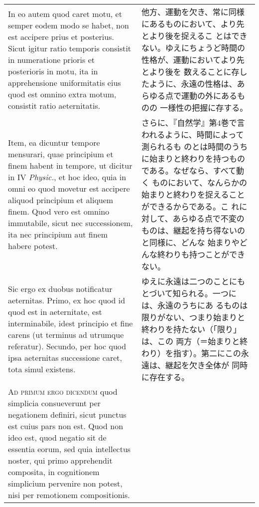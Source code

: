 \documentclass[10pt]{jsarticle} %
\begin{document}
\begin{longtable}{p{21em}p{21em}}
\\

In eo autem quod caret motu, et semper eodem modo se habet, non est
accipere prius et posterius. Sicut igitur ratio temporis consistit in
numeratione prioris et posterioris in motu, ita in apprehensione
uniformitatis eius quod est omnino extra motum, consistit ratio
aeternitatis.

&

他方、運動を欠き、常に同様にあるものにおいて、より先とより後を捉えるこ
とはできない。ゆえにちょうど時間の性格が、運動においてより先とより後を
数えることに存したように、永遠の性格は、あらゆる点で運動の外にあるものの
一様性の把握に存する。

\\

Item, ea dicuntur tempore mensurari, quae principium et finem
habent in tempore, ut dicitur in IV {\it Physic.}, et hoc ideo, quia in
omni eo quod movetur est accipere aliquod principium et aliquem
finem. Quod vero est omnino immutabile, sicut nec successionem, ita nec
principium aut finem habere potest.

&

さらに、『自然学』第4巻で言われるように、時間によって測られるも
のとは時間のうちに始まりと終わりを持つものである。なぜなら、すべて動く
ものにおいて、なんらかの始まりと終わりを捉えることができるからである。こ
れに対して、あらゆる点で不変のものは、継起を持ち得ないのと同様に、どんな
始まりやどんな終わりも持つことができない。


\\

Sic ergo ex duobus notificatur aeternitas. Primo, ex hoc quod
id quod est in aeternitate, est interminabile, idest principio et fine
carens (ut terminus ad utrumque referatur). Secundo, per hoc quod ipsa
aeternitas successione caret, tota simul existens.

&

ゆえに永遠は二つのことにもとづいて知られる。一つには、永遠のうちにあ
るものは限りがない、つまり始まりと終わりを持たない（「限り」は、この
両方（＝始まりと終わり）を指す）。第二にこの永遠は、継起を欠き全体が
同時に存在する。

\\


{\scshape Ad primum ergo dicendum} quod simplicia consueverunt per negationem
definiri, sicut punctus est cuius pars non est. Quod non ideo est, quod
negatio sit de essentia eorum, sed quia intellectus noster, qui primo
apprehendit composita, in cognitionem simplicium pervenire non potest,
nisi per remotionem compositionis.


\end{longtable}
\end{document}
